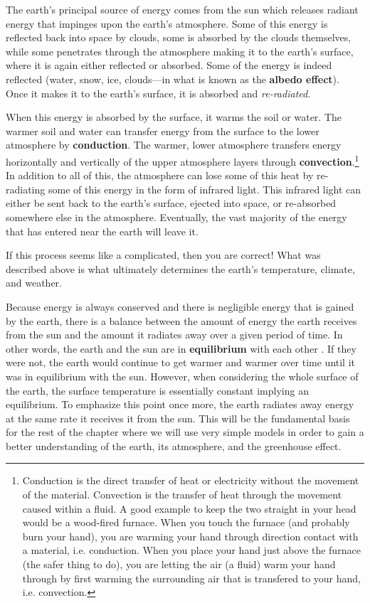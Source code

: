     The earth's principal source of energy comes from the sun which releases radiant energy that impinges upon the earth's atmosphere.  Some of this energy is reflected back into space by clouds, some is absorbed by the clouds themselves, while some penetrates through the atmosphere making it to the earth's surface, where it is again either reflected or absorbed. Some of the energy is indeed reflected (water, snow, ice, clouds---in what is known as the \textbf{albedo effect}). Once it makes it to the earth's surface, it is absorbed and \emph{re-radiated}.

    When this energy is absorbed by the surface, it warms the soil or water. The warmer soil and water can transfer energy from the surface to the lower atmosphere by \textbf{conduction}. The warmer, lower atmosphere transfers energy horizontally and vertically of the upper atmosphere layers through \textbf{convection}.\footnote{
        Conduction is the direct transfer of heat or electricity without the movement of the material. Convection is the transfer of heat through the movement caused within a fluid. A good example to keep the two straight in your head would be a wood-fired furnace. When you touch the furnace (and probably burn your hand), you are warming your hand through direction contact with a material, i.e. conduction. When you place your hand just above the furnace (the safer thing to do), you are letting the air (a fluid) warm your hand through by first warming the surrounding air that is transfered to your hand, i.e. convection.
        } 
    In addition to all of this, the atmosphere can lose some of this heat by re-radiating some of this energy in the form of infrared light. This infrared light can either be sent back to the earth's surface, ejected into space, or re-absorbed somewhere else in the atmosphere. Eventually, the vast majority of the energy that has entered near the earth will leave it. 

    If this process seems like a complicated, then you are correct! What was described above is what ultimately determines the earth's temperature, climate, and weather.

    Because energy is always conserved and there is negligible energy that is gained by the earth, there is a balance between the amount of energy the earth receives from the sun and the amount it radiates away over a given period of time. In other words, the earth and the sun are in \textbf{equilibrium} with each other \citep{thorndike1976energy}. If they were not, the earth would continue to get warmer and warmer over time until it was in equilibrium with the sun. However, when considering the whole surface of the earth, the surface temperature is essentially constant implying an equilibrium. To emphasize this point once more, the earth radiates away energy at the same rate it receives it from the sun. This will be the fundamental basis for the rest of the chapter where we will use very simple models in order to gain a better understanding of the earth, its atmosphere, and the greenhouse effect.


